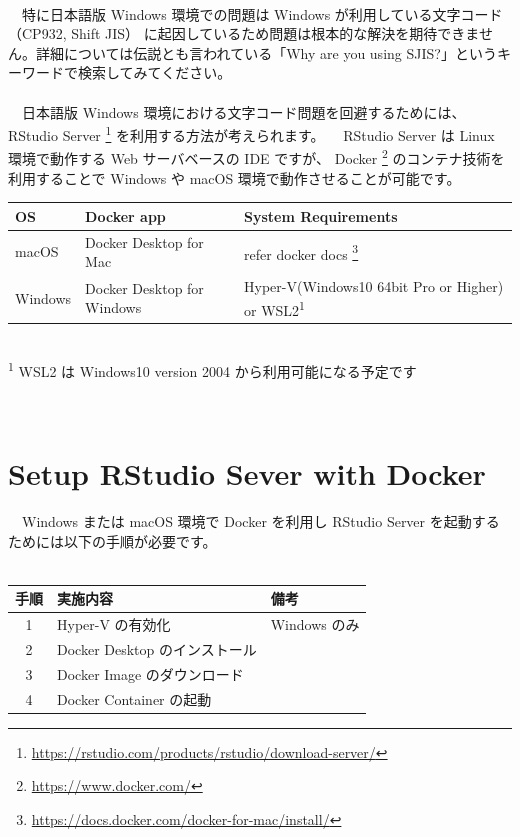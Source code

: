 \documentclass[
  12pt,
]{book}
\DeclareRobustCommand{\href}[2]{#2\footnote{\url{#1}}}
\begin{document}
　\\
　特に日本語版 Windows 環境での問題は Windows が利用している文字コード（CP932, Shift JIS） に起因しているため問題は根本的な解決を期待できません。詳細については伝説とも言われている「Why are you using SJIS?」というキーワードで検索してみてください。\\
　\\
　日本語版 Windows 環境における文字コード問題を回避するためには、 \href{https://rstudio.com/products/rstudio/download-server/}{RStudio Server } を利用する方法が考えられます。 　RStudio Server は Linux 環境で動作する Web サーバベースの IDE ですが、 \href{https://www.docker.com/}{Docker } のコンテナ技術を利用することで Windows や macOS 環境で動作させることが可能です。 　

\begin{longtable}[]{@{}
  >{\raggedright\arraybackslash}p{}
  >{\raggedright\arraybackslash}p{}
  >{\raggedright\arraybackslash}p{}@{}}
\toprule
OS & Docker app & System Requirements \\
\midrule
\endhead
macOS & Docker Desktop for Mac & \href{https://docs.docker.com/docker-for-mac/install/}{refer docker docs } \\
Windows & Docker Desktop for Windows & Hyper-V(Windows10 64bit Pro or Higher) or WSL2\textsuperscript{1} \\
\bottomrule
\end{longtable}

　\\
\textsuperscript{1} WSL2 は Windows10 version 2004 から利用可能になる予定です

　

\hypertarget{setup-rstudio-sever-with-docker}{%
\section{Setup RStudio Sever with Docker}\label{setup-rstudio-sever-with-docker}}

　Windows または macOS 環境で Docker を利用し RStudio Server を起動するためには以下の手順が必要です。\\
　

\begin{longtable}[]{@{}cll@{}}
\toprule
手順 & 実施内容 & 備考 \\
\midrule
\endhead
1 & Hyper-V の有効化 & Windows のみ \\
2 & Docker Desktop のインストール & \\
3 & Docker Image のダウンロード & \\
4 & Docker Container の起動 & \\
\bottomrule
\end{longtable}
\end{document}
